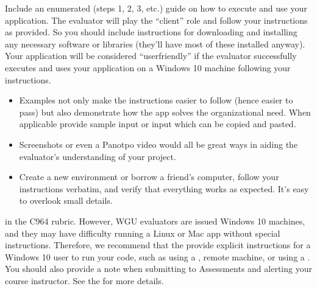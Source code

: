 \documentclass[letterpaper,10pt,english]{jupyterBook}
\begin{document}
\sphinxAtStartPar
Include an enumerated (steps 1, 2, 3, etc.) guide on how to execute and use your application. The evaluator will play the “client” role and follow your instructions as provided. So you should include instructions for downloading and installing any necessary software or libraries (they’ll have most of these installed anyway). Your application will be considered “user\sphinxhyphen{}friendly” if the evaluator successfully executes and uses your application on a Windows 10 machine following your instructions.
\begin{itemize}
\item {} 
\sphinxAtStartPar
{} Examples not only make the instructions easier to follow (hence easier to pass) but also demonstrate how the app solves the organizational need. When applicable provide sample input or input which can be copied and pasted.

\item {} 
\sphinxAtStartPar
{} Screenshots or even a Panotpo video would all be great ways in aiding the evaluator’s understanding of your project.

\item {} 
\sphinxAtStartPar
{} Create a new environment or borrow a friend’s computer, follow your instructions verbatim, and verify that everything works as expected. It’s easy to overlook small details.

\end{itemize}

\begin{sphinxShadowBox}

\sphinxAtStartPar
{} in the C964 rubric. However, WGU evaluators are issued Windows 10 machines, and they may have difficulty running a Linux or Mac app without special instructions. Therefore, we recommend that the  provide explicit instructions for a Windows 10 user to run your code, such as using a , remote machine, or using a . You should also provide a note when submitting to Assessments and alerting your course instructor. See the  for more details.

\label{\detokenize{task2_doc/task2_doc_d:task2-doc-d-user-guide-examples}}\end{sphinxShadowBox}
\end{document}
